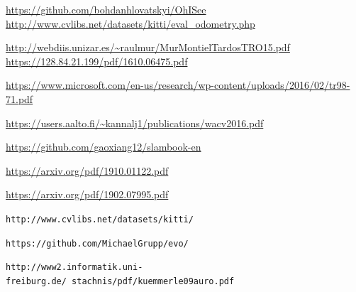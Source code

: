 \pagebreak
\appendix
\begin{thebibliography}{10}

 \url{https://github.com/bohdanhlovatskyi/OhISee}
 \url{http://www.cvlibs.net/datasets/kitti/eval_odometry.php}

 \url{http://webdiis.unizar.es/~raulmur/MurMontielTardosTRO15.pdf}
 \url{https://128.84.21.199/pdf/1610.06475.pdf}

 \url{https://www.microsoft.com/en-us/research/wp-content/uploads/2016/02/tr98-71.pdf} 

 \url{https://users.aalto.fi/~kannalj1/publications/wacv2016.pdf}

 \url{https://github.com/gaoxiang12/slambook-en}

 \url{https://arxiv.org/pdf/1910.01122.pdf}

 \url{https://arxiv.org/pdf/1902.07995.pdf}

\texttt{http://www.cvlibs.net/datasets/kitti/}

\texttt{https://github.com/MichaelGrupp/evo/}

\texttt{http://www2.informatik.uni-freiburg.de/~stachnis/pdf/kuemmerle09auro.pdf}

\end{thebibliography}


